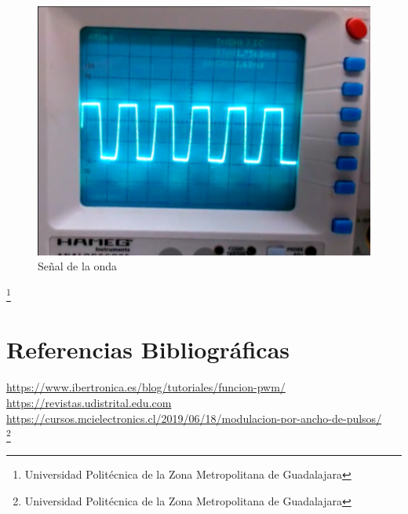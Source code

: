 \documentclass[12pt,a4paper]{article}
\begin{document}
\begin{figure}[hbtp]
\centering
\includegraphics[scale=0.7]{Pictures/Onda.PNG}
\caption{Señal de la onda}
\end{figure}
\footnote{Universidad Politécnica de la Zona Metropolitana de Guadalajara}

\newpage
\section{Referencias Bibliográficas}
\url{https://www.ibertronica.es/blog/tutoriales/funcion-pwm/}\\

\url{https://revistas.udistrital.edu.com}\\

\url{https://cursos.mcielectronics.cl/2019/06/18/modulacion-por-ancho-de-pulsos/}\\


\footnote{Universidad Politécnica de la Zona Metropolitana de Guadalajara}
\end{document}
